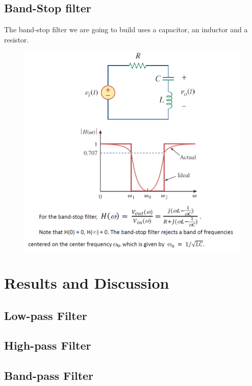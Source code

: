 \documentclass{article}
\begin{document}
\newpage

\subsection{Band-Stop filter}

The band-stop filter we are going to build uses a capacitor, an inductor and a resistor.

\begin{figure}[!h]
	\centering
	\includegraphics[width=12cm]{6.png}
	\label{fig-6}
\end{figure}

\newpage

\section{Results and Discussion}

\subsection{Low-pass Filter}



\subsection{High-pass Filter}



\subsection{Band-pass Filter}
\end{document}
